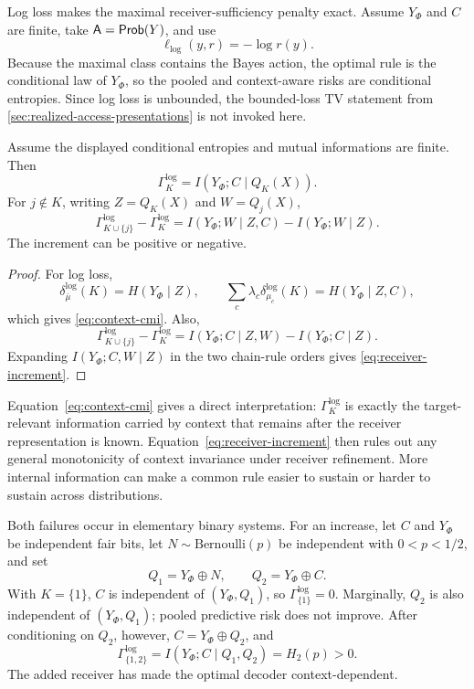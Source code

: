 Log loss makes the maximal receiver-sufficiency penalty exact. Assume $Y_\Phi$ and $C$ are finite, take $\mathsf A=\mathsf{Prob}(Y)$, and use
\[
\ell_{\log}(y,r)=-\log r(y).
\]
Because the maximal class contains the Bayes action, the optimal rule is the conditional law of $Y_\Phi$, so the pooled and context-aware risks are conditional entropies. Since log loss is unbounded, the bounded-loss TV statement from \cref{sec:realized-access-presentations} is not invoked here.

\begin{theorem}
\label{thm:contextuality-cmi}
\label{thm:contextuality-receiver-increment}
Assume the displayed conditional entropies and mutual informations are finite. Then
\begin{equation}
\Gamma_K^{\log}
=
I(Y_\Phi;C\mid Q_K(X)).
\label{eq:context-cmi}
\end{equation}
For $j\notin K$, writing $Z=Q_K(X)$ and $W=Q_j(X)$,
\begin{equation}
\boxed{
\Gamma_{K\cup\{j\}}^{\log}-\Gamma_K^{\log}
=
I(Y_\Phi;W\mid Z,C)
-
I(Y_\Phi;W\mid Z).
}
\label{eq:receiver-increment}
\end{equation}
The increment can be positive or negative.
\end{theorem}
\begin{proof}
For log loss,
\[
\delta_{\bar\mu}^{\log}(K)=H(Y_\Phi\mid Z),
\qquad
\sum_c\lambda_c\delta_{\mu_c}^{\log}(K)=H(Y_\Phi\mid Z,C),
\]
which gives \cref{eq:context-cmi}. Also,
\[
\Gamma_{K\cup\{j\}}^{\log}-\Gamma_K^{\log}
=
I(Y_\Phi;C\mid Z,W)-I(Y_\Phi;C\mid Z).
\]
Expanding $I(Y_\Phi;C,W\mid Z)$ in the two chain-rule orders gives \cref{eq:receiver-increment}.
\end{proof}

Equation~\eqref{eq:context-cmi} gives a direct interpretation: $\Gamma_K^{\log}$ is exactly the target-relevant information carried by context that remains after the receiver representation is known. Equation~\eqref{eq:receiver-increment} then rules out any general monotonicity of context invariance under receiver refinement. More internal information can make a common rule easier to sustain or harder to sustain across distributions.

Both failures occur in elementary binary systems. For an increase, let $C$ and $Y_\Phi$ be independent fair bits, let $N\sim\mathrm{Bernoulli}(p)$ be independent with $0<p<1/2$, and set
\[
Q_1=Y_\Phi\oplus N,\qquad Q_2=Y_\Phi\oplus C.
\]
With $K=\{1\}$, $C$ is independent of $(Y_\Phi,Q_1)$, so $\Gamma_{\{1\}}^{\log}=0$. Marginally, $Q_2$ is also independent of $(Y_\Phi,Q_1)$; pooled predictive risk does not improve. After conditioning on $Q_2$, however, $C=Y_\Phi\oplus Q_2$, and
\[
\Gamma_{\{1,2\}}^{\log}
=I(Y_\Phi;C\mid Q_1,Q_2)
=H_2(p)>0.
\]
The added receiver has made the optimal decoder context-dependent.

